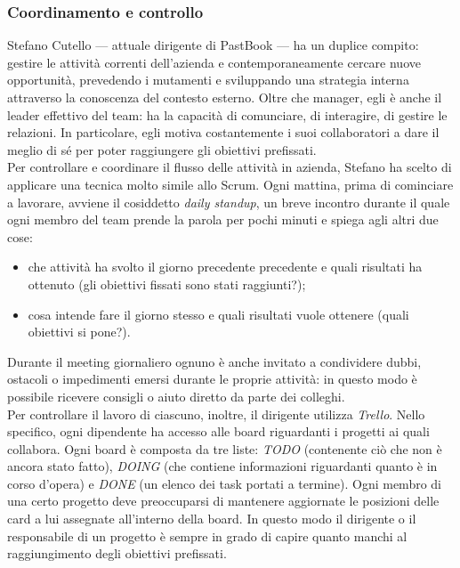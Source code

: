 			\subsubsection{Coordinamento e controllo}
				Stefano Cutello — attuale dirigente di PastBook — ha un duplice compito: gestire le attività correnti dell'azienda e
				contemporaneamente cercare nuove opportunità, prevedendo i mutamenti e sviluppando una strategia interna attraverso
				la conoscenza del contesto esterno. Oltre che manager, egli è anche il leader effettivo del team: ha la capacità di
				comunciare, di interagire, di gestire le relazioni. In particolare, egli motiva costantemente i suoi collaboratori a
				dare il meglio di sé per poter raggiungere gli obiettivi prefissati.\\
				Per controllare e coordinare il flusso delle attività in azienda, Stefano ha scelto di applicare una tecnica molto
				simile allo Scrum. Ogni mattina, prima di cominciare a lavorare, avviene il
				cosiddetto \emph{daily standup}, un breve incontro durante il quale ogni membro del team prende la parola per pochi
				minuti e spiega agli altri due cose:
				\begin{itemize}
					\item che attività ha svolto il giorno precedente precedente e quali risultati ha ottenuto (gli obiettivi
					fissati sono stati raggiunti?);
					\item cosa intende fare il giorno stesso e quali risultati vuole ottenere (quali obiettivi si pone?).
				\end{itemize}
				Durante il meeting giornaliero ognuno è anche invitato a condividere dubbi, ostacoli o impedimenti emersi durante le
				proprie attività: in questo modo è possibile ricevere consigli o aiuto diretto da parte dei colleghi.\\
				Per controllare il lavoro di ciascuno, inoltre, il dirigente utilizza
				\emph{Trello}. Nello specifico, ogni dipendente ha accesso alle board riguardanti
				i progetti ai quali collabora. Ogni board è composta da tre liste: \emph{TODO} (contenente ciò che non è ancora
				stato fatto), \emph{DOING} (che contiene informazioni riguardanti quanto è in corso d'opera) e \emph{DONE} (un
				elenco dei task portati a termine). Ogni membro di una certo progetto deve preoccuparsi di mantenere aggiornate le
				posizioni delle card a lui assegnate all'interno della board. In questo modo il dirigente o il responsabile di un
				progetto è sempre in grado di capire quanto manchi al raggiungimento degli obiettivi prefissati.\\
